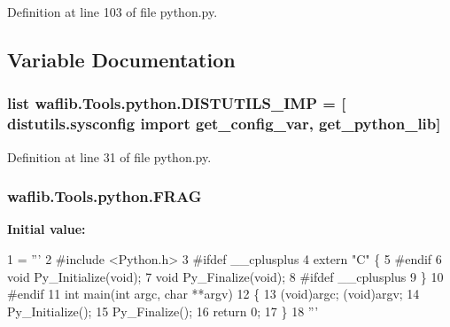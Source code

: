 Definition at line 103 of file python.\+py.



\subsection{Variable Documentation}
\subsubsection[{\texorpdfstring{D\+I\+S\+T\+U\+T\+I\+L\+S\+\_\+\+I\+MP}{DISTUTILS_IMP}}]{\setlength{\rightskip}{0pt plus 5cm}list waflib.\+Tools.\+python.\+D\+I\+S\+T\+U\+T\+I\+L\+S\+\_\+\+I\+MP = \mbox{[} distutils.\+sysconfig import get\+\_\+config\+\_\+var, get\+\_\+python\+\_\+lib\textquotesingle{}\mbox{]}}\hypertarget{namespacewaflib_1_1_tools_1_1python_a8fb0e68557dd31d6d663a4effde08373}{}\label{namespacewaflib_1_1_tools_1_1python_a8fb0e68557dd31d6d663a4effde08373}


Definition at line 31 of file python.\+py.

\subsubsection[{\texorpdfstring{F\+R\+AG}{FRAG}}]{ waflib.\+Tools.\+python.\+F\+R\+AG}\hypertarget{namespacewaflib_1_1_tools_1_1python_a04b6492b79c74b4ae741e2ad60970987}{}\label{namespacewaflib_1_1_tools_1_1python_a04b6492b79c74b4ae741e2ad60970987}
{\bfseries Initial value\+:}
\begin{DoxyCode}
1 = \textcolor{stringliteral}{'''}
2 \textcolor{stringliteral}{#include <Python.h>}
3 \textcolor{stringliteral}{#ifdef \_\_cplusplus}
4 \textcolor{stringliteral}{extern "C" \{}
5 \textcolor{stringliteral}{#endif}
6 \textcolor{stringliteral}{    void Py\_Initialize(void);}
7 \textcolor{stringliteral}{    void Py\_Finalize(void);}
8 \textcolor{stringliteral}{#ifdef \_\_cplusplus}
9 \textcolor{stringliteral}{\}}
10 \textcolor{stringliteral}{#endif}
11 \textcolor{stringliteral}{int main(int argc, char **argv)}
12 \textcolor{stringliteral}{\{}
13 \textcolor{stringliteral}{   (void)argc; (void)argv;}
14 \textcolor{stringliteral}{   Py\_Initialize();}
15 \textcolor{stringliteral}{   Py\_Finalize();}
16 \textcolor{stringliteral}{   return 0;}
17 \textcolor{stringliteral}{\}}
18 \textcolor{stringliteral}{'''}
\end{DoxyCode}


